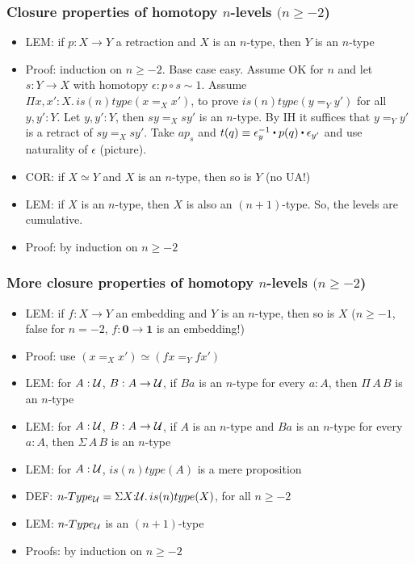 \documentclass[handout]{beamer}
\newcommand{\depi}[3]{\Pi{#1{:}#2.\,#3}}
\newcommand{\sigm}[3]{\Sigma{#1{:}#2.\,#3}}
\newcommand{\UU}{{\cal U}}
\newcommand{\bfnull}{\mathbf{0}}
\newcommand{\bfone}{\mathbf{1}}
\newcommand{\ct}{%
  \mathchoice{\mathbin{\raisebox{0.5ex}{$\displaystyle\centerdot$}}}%
             {\mathbin{\raisebox{0.5ex}{$\centerdot$}}}%
             {\mathbin{\raisebox{0.25ex}{$\scriptstyle\,\centerdot\,$}}}%
             {\mathbin{\raisebox{0.1ex}{$\scriptscriptstyle\,\centerdot\,$}}}
}
\begin{document}
 \frame
  {
    \frametitle{Closure properties of homotopy $n$-levels $(n\geq-2$)}
    
\begin{itemize} 
    \item LEM: if $p:X\to Y$ a retraction and $X$ is an $n$-type, then $Y$ is an $n$-type
    \item Proof: induction on $n\geq-2$. Base case easy. Assume OK for $n$ and let $s:Y\to X$
              with homotopy $\epsilon: p\circ s \sim 1$. Assume $\depi{x,x'}{X}{is(n)type(x=_X x')}$,
              to prove ${is(n)type(y=_Y y')}$ for all ${y,y'}:{Y}$. Let $y,y':Y$, then $sy =_X sy'$ is an $n$-type.
              By IH it suffices that $y=_Y y'$ is a retract of $sy =_X sy'$. Take $ap_s$ and
              $t(q)\equiv \epsilon_y^{-1}\ct p(q)\ct \epsilon_{y'}$ and use naturality of $\epsilon$ (picture).
    \item COR: if $X\simeq Y$ and $X$ is an $n$-type, then so is $Y$ (no UA!) %
    \item LEM:  if $X$ is an $n$-type, then $X$ is also an $(n+1)$-type.  %
              So, the levels are cumulative. 
    \item Proof: by induction on $n\geq-2$
\end{itemize}
  }
  
   \frame
  {
    \frametitle{More closure properties of homotopy $n$-levels  $(n\geq-2$)}
    
\begin{itemize} 
    \item LEM: if $f:X\to Y$ an embedding and $Y$ is an $n$-type, then so is $X$ ($n\geq-1$,
    false for $n=-2$, $f:\bfnull\to\bfone$ is an embedding!)
    \item Proof: use $(x=_X x') \simeq (fx=_Y fx')$
    \item LEM:  for $A:\UU$, $B:A\to\UU$, if $Ba$ is an $n$-type for every $a:A$, then $\Pi\,A\,B$ is an $n$-type %
    \item LEM:  for $A:\UU$, $B:A\to\UU$, if $A$ is an  $n$-type and $Ba$ is an $n$-type for every $a:A$, then $\Sigma\,A\,B$ is an $n$-type %
    \item LEM:  for $A:\UU$, $is(n)type(A)$ is a mere proposition %
    \item DEF: $n\mbox{-}Type_\UU = \sigm{X}{\UU}{is(n)type(X)}$, for all $n\geq-2$
    \item LEM: $n\mbox{-}Type_\UU$ is an $(n+1)$-type%
    \item Proofs: by induction on $n\geq-2$
\end{itemize}
  }
\end{document}
